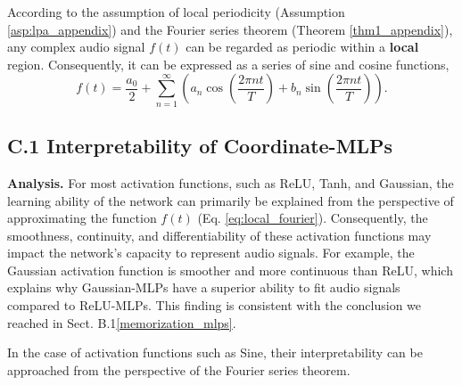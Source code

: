 \documentclass[letterpaper]{article} %
\begin{document}
According to the assumption of local periodicity (Assumption \ref{asp:lpa_appendix}) and the Fourier series theorem (Theorem \ref{thm1_appendix}), any complex audio signal \( f(t) \) can be regarded as periodic within a \textbf{local} region. Consequently, it can be expressed as a series of sine and cosine functions,
\begin{equation}
    \label{eq:local_fourier}
    f(t) = \frac{a_0}{2} + \sum_{n=1}^{\infty} \left( a_n \cos\left(\frac{2\pi nt}{T}\right) + b_n \sin\left(\frac{2\pi nt}{T}\right) \right).
\end{equation}

\subsection{C.1 Interpretability of Coordinate-MLPs}
\textbf{Analysis.} For most activation functions, such as ReLU, Tanh, and Gaussian, the learning ability of the network can primarily be explained from the perspective of approximating the function \( f(t) \) (Eq. \ref{eq:local_fourier}). Consequently, the smoothness, continuity, and differentiability of these activation functions may impact the network's capacity to represent audio signals. For example, the Gaussian activation function is smoother and more continuous than ReLU, which explains why Gaussian-MLPs have a superior ability to fit audio signals compared to ReLU-MLPs. This finding is consistent with the conclusion we reached in Sect. 
 B.1\ref{memorization_mlps}.

In the case of activation functions such as Sine, their interpretability can be approached from the perspective of the Fourier series theorem.
\end{document}
